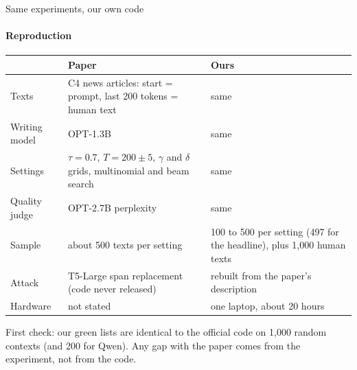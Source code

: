 \documentclass[aspectratio=169,10pt,t]{beamer}
\begin{document}
\begin{frame}{Same experiments, our own code}
  \framesubtitle{Reproduction}
  {\small
  \begin{tabular}{@{}p{}p{}p{}@{}}
    \toprule
     & Paper & Ours \\
    \midrule
    Texts & \raggedright C4 news articles: start = prompt, last 200 tokens = human text & \raggedright same \tabularnewline
    Writing model & OPT-1.3B & same \\
    Settings & \raggedright $\tau = 0.7$, $T = 200 \pm 5$, $\gamma$ and $\delta$ grids, multinomial and beam search & \raggedright same \tabularnewline
    Quality judge & OPT-2.7B perplexity & same \\
    Sample & \raggedright about 500 texts per setting & \raggedright 100 to 500 per setting (497 for the headline), plus 1{,}000 human texts \tabularnewline
    Attack & \raggedright T5-Large span replacement (code never released) & \raggedright rebuilt from the paper's description \tabularnewline
    Hardware & not stated & one laptop, about 20 hours \\
    \bottomrule
  \end{tabular}}
  \vspace{0.2em}
  \begin{goodbox}
    First check: our green lists are identical to the official code on 1{,}000 random contexts (and 200 for Qwen). Any gap with the paper comes from the experiment, not from the code.
  \end{goodbox}
\end{frame}
\end{document}
